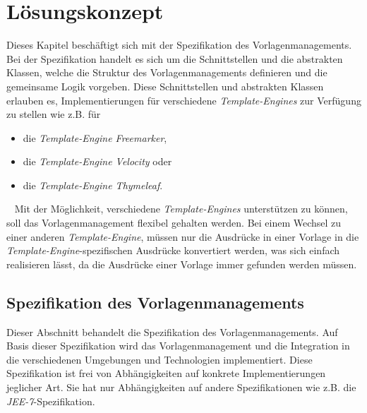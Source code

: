 \chapter{Lösungskonzept}
\label{cha:Lösungskonzept}
Dieses Kapitel beschäftigt sich mit der Spezifikation des Vorlagenmanagements. Bei der Spezifikation handelt es sich um die Schnittstellen und die abstrakten Klassen, welche die Struktur des Vorlagenmanagements definieren und die gemeinsame Logik vorgeben. Diese Schnittstellen und abstrakten Klassen erlauben es, Implementierungen für verschiedene \emph{Template-Engines} zur Verfügung zu stellen wie z.B. für
\begin{itemize}
	\item die \emph{Template-Engine Freemarker},
	\item die \emph{Template-Engine Velocity} oder
	\item die \emph{Template-Engine Thymeleaf}.
\end{itemize}
\ \newline
Mit der Möglichkeit, verschiedene \emph{Template-Engines} unterstützen zu können, soll das Vorlagenmanagement flexibel gehalten werden. Bei einem Wechsel zu einer anderen \emph{Template-Engine}, müssen nur die Ausdrücke in einer Vorlage in die \emph{Template-Engine}-spezifischen Ausdrücke konvertiert werden, was sich einfach realisieren lässt, da die Ausdrücke einer Vorlage immer gefunden werden müssen.

\section{Spezifikation des Vorlagenmanagements}
\label{sec:specification-template-management}
Dieser Abschnitt behandelt die Spezifikation des Vorlagenmanagements. Auf Basis dieser Spezifikation wird das Vorlagenmanagement und die Integration in die verschiedenen Umgebungen und Technologien implementiert. Diese Spezifikation ist frei von Abhängigkeiten auf konkrete Implementierungen jeglicher Art. Sie hat nur Abhängigkeiten auf andere Spezifikationen wie z.B. die \emph{JEE-7}-Spezifikation.
\newpage

